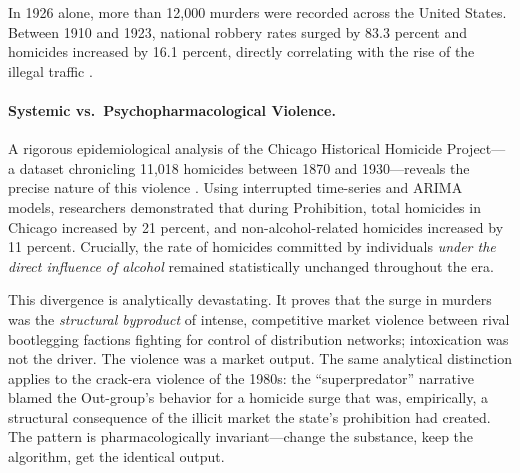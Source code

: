 In 1926 alone, more than 12,000 murders were recorded across the United States. Between 1910 and 1923, national robbery rates surged by 83.3 percent and homicides increased by 16.1 percent, directly correlating with the rise of the illegal traffic \cite{newdeal_crime}.

\paragraph{Systemic vs.\ Psychopharmacological Violence.}
A rigorous epidemiological analysis of the Chicago Historical Homicide Project---a dataset chronicling 11,018 homicides between 1870 and 1930---reveals the precise nature of this violence \cite{asbridge2009}. Using interrupted time-series and ARIMA models, researchers demonstrated that during Prohibition, total homicides in Chicago increased by 21 percent, and non-alcohol-related homicides increased by 11 percent. Crucially, the rate of homicides committed by individuals \textit{under the direct influence of alcohol} remained statistically unchanged throughout the era.

This divergence is analytically devastating. It proves that the surge in murders was the \textit{structural byproduct} of intense, competitive market violence between rival bootlegging factions fighting for control of distribution networks; intoxication was not the driver. The violence was a market output. The same analytical distinction applies to the crack-era violence of the 1980s: the ``superpredator'' narrative blamed the Out-group's behavior for a homicide surge that was, empirically, a structural consequence of the illicit market the state's prohibition had created. The pattern is pharmacologically invariant---change the substance, keep the algorithm, get the identical output.

